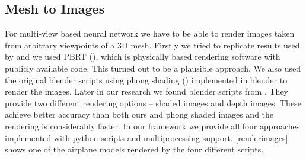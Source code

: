 \subsection{Mesh to Images}
\label{subsec:meshtoimgs}
For multi-view based neural network we have to be able to render images taken from arbitrary viewpoints of a 3D mesh. Firstly we tried to replicate results used by \cite{su_multi-view_2015} and we used PBRT (\cite{pharr_physically_2010}), which is physically based rendering software with publicly available code. This turned out to be a plausible approach. We also used the original blender scripts using phong shading (\cite{bishop_fast_1986}) implemented in blender to render the images.
Later in our research we found blender scripts from \cite{su_deeper_2018}. They provide two different rendering options -- shaded images and depth images. These achieve better accuracy than both ours and phong shaded images and the rendering is considerably faster. In our framework we provide all four approaches implemented with python scripts and multiprocessing support. \autoref{renderimages} shows one of the airplane models rendered by the four different scripts.

